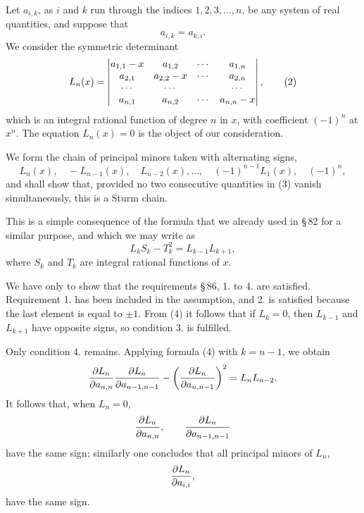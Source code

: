 \documentclass[11pt]{article}
\begin{document}
Let $a_{i,k}$, as $i$ and $k$ run through the indices $1,2,3,\ldots,n$, be any system of real quantities, and suppose that
\begin{equation}
        a_{i,k}=a_{k,i}.
\tag{1}
\end{equation}
We consider the symmetric determinant
\begin{equation}
        L_n(x)=
        \begin{vmatrix}
        a_{1,1}-x&a_{1,2}&\cdots&a_{1,n}\cr
        a_{2,1}&a_{2,2}-x&\cdots&a_{2,n}\cr
        \cdots&\cdots&&\cdots\cr
        a_{n,1}&a_{n,2}&\cdots&a_{n,n}-x
        \end{vmatrix},
\tag{2}
\end{equation}
which is an integral rational function of degree $n$ in $x$, with coefficient $(-1)^n$ at $x^n$. The equation $L_n(x)=0$ is the object of our consideration.

We form the chain of principal minors taken with alternating signs,
\begin{equation}
        L_n(x),
        \quad -L_{n-1}(x),
        \quad L_{n-2}(x),
        \ldots,
        \quad (-1)^{n-1}L_1(x),
        \quad (-1)^n,
\tag{3}
\end{equation}
and shall show that, provided no two consecutive quantities in (3) vanish simultaneously, this is a Sturm chain.

This is a simple consequence of the formula that we already used in \S\,82 for a similar purpose, and which we may write as
\begin{equation}
        L_kS_k-T_k^2=L_{k-1}L_{k+1},
\tag{4}
\end{equation}
where $S_k$ and $T_k$ are integral rational functions of $x$.

We have only to show that the requirements \S\,86, 1. to 4. are satisfied. Requirement 1. has been included in the assumption, and 2. is satisfied because the last element is equal to $\pm1$. From (4) it follows that if $L_k=0$, then $L_{k-1}$ and $L_{k+1}$ have opposite signs, so condition 3. is fulfilled.

Only condition 4. remains. Applying formula (4) with $k=n-1$, we obtain
\[
        {\partial L_n\over\partial a_{n,n}}
        {\partial L_n\over\partial a_{n-1,n-1}}
        -\left({\partial L_n\over\partial a_{n,n-1}}\right)^2
        =L_nL_{n-2}.
\]
It follows that, when $L_n=0$,
\[
        {\partial L_n\over\partial a_{n,n}},
        \qquad
        {\partial L_n\over\partial a_{n-1,n-1}}
\]
have the same sign; similarly one concludes that all principal minors of $L_n$,
\[
        {\partial L_n\over\partial a_{i,i}},
\]
have the same sign.
\end{document}
